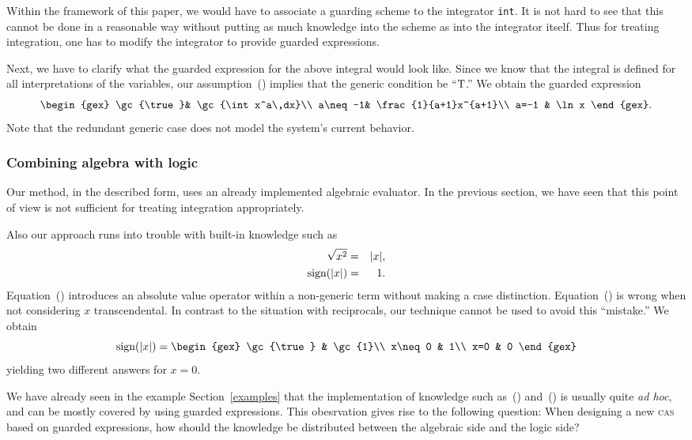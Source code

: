 Within the framework of this paper, we would have to associate a
guarding scheme to the integrator {\tt int}. It is not hard to see
that this cannot be done in a reasonable way without putting as much
knowledge into the scheme as into the integrator itself. Thus for
treating integration, one has to modify the integrator to provide
guarded expressions.

Next, we have to clarify what the guarded expression for the above
integral would look like. Since we know that the integral is defined
for all interpretations of the variables, our
assumption~() implies that the generic condition be
``$\textrm{T}$.'' We obtain the guarded expression
\[
\begin{gex}
\gc{\true}& \gc{\int x^a\,dx}\\
a\neq-1& \frac{1}{a+1}x^{a+1}\\
a=-1 & \ln x
\end{gex}.
\]
Note that the redundant generic case does not model the system's
current behavior.
%
\subsubsection{Combining algebra with logic}
Our method, in the described form, uses an already implemented
algebraic evaluator. In the previous section, we have seen that this
point of view is not sufficient for treating integration
appropriately.

Also our approach runs into trouble with built-in knowledge such as
\begin{eqnarray}
\sqrt{x^2}&=&|x|\label{sqrtrule},\\
\textrm{sign}(|x|)&=&1\label{signrule}.
\end{eqnarray}
Equation~() introduces an absolute value operator within
a non-generic term without making a case distinction.
Equation~() is wrong when not considering $x$
transcendental. In contrast to the situation with reciprocals, our
technique cannot be used to avoid this ``mistake.'' We obtain
\[
\sign(|x|)=\begin{gex}
\gc{\true} & \gc{1}\\
x\neq0 & 1\\
x=0 & 0
	   \end{gex}
\]
yielding two different answers for $x=0$.

We have already seen in the example Section~\ref{examples} that the
implementation of knowledge such as~()
and~() is usually quite {\it ad hoc}, and can be mostly
covered by using guarded expressions. This obesrvation gives rise to
the following question: When designing a new \textsc{cas} based on guarded
expressions, how should the knowledge be distributed between the
algebraic side and the logic side?
%
